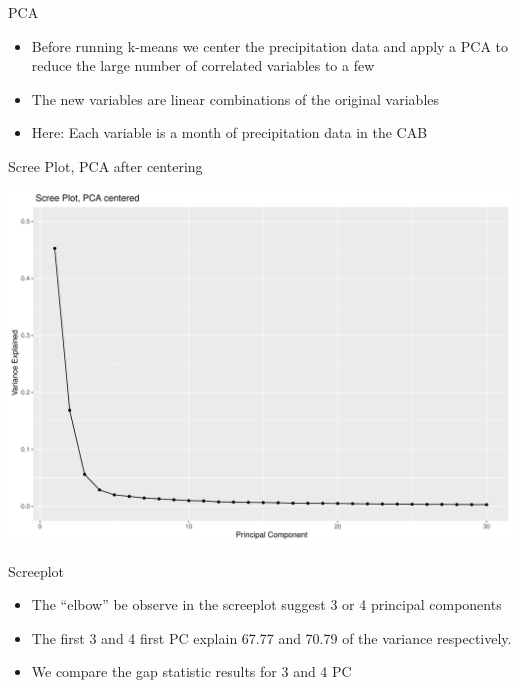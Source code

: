 \documentclass[
  ignorenonframetext,
]{beamer}
\providecommand{\tightlist}{%
  \setlength{\itemsep}{0pt}\setlength{\parskip}{0pt}}
\begin{document}
\begin{frame}{PCA}
\protect\hypertarget{pca}{}
\begin{itemize}
\tightlist
\item
  Before running k-means we center the precipitation data and apply a
  PCA to reduce the large number of correlated variables to a few
\item
  The new variables are linear combinations of the original variables
\item
  Here: Each variable is a month of precipitation data in the CAB
\end{itemize}
\end{frame}

\begin{frame}{Scree Plot, PCA after centering}
\protect\hypertarget{scree-plot-pca-after-centering}{}
\begin{center}\includegraphics[width=0.75\linewidth]{ma-presentation_files/figure-beamer/unnamed-chunk-10-1} \end{center}
\end{frame}

\begin{frame}{Screeplot}
\protect\hypertarget{screeplot}{}
\begin{itemize}
\tightlist
\item
  The ``elbow'' be observe in the screeplot suggest 3 or 4 principal
  components
\item
  The first 3 and 4 first PC explain 67.77 and 70.79 of the variance
  respectively.
\item
  We compare the gap statistic results for 3 and 4 PC
\end{itemize}
\end{frame}
\end{document}
